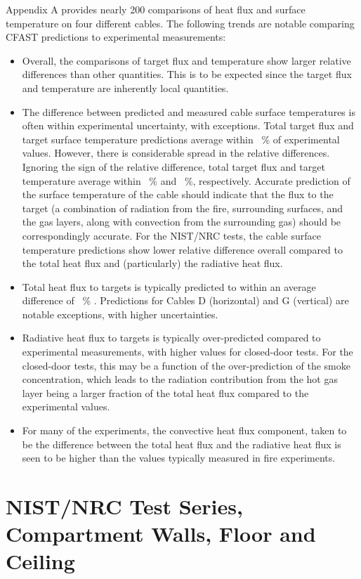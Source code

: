 Appendix A provides nearly 200 comparisons of heat flux and surface temperature on four different cables.  The following trends are notable comparing CFAST predictions to experimental measurements:
\begin{itemize}
\item Overall, the comparisons of target flux and temperature show larger relative differences than other quantities. This is to be expected since the target flux and temperature are inherently local quantities.
\item The difference between predicted and measured cable surface temperatures is often within experimental uncertainty, with exceptions.  Total target flux and target surface temperature predictions average within \Targfluxavg ~\% of experimental values.  However, there is considerable spread in the relative differences.  Ignoring the sign of the relative difference, total target flux and target temperature average within \Abstargfluxavg ~\% and \Abstargtempavg ~\%, respectively. Accurate prediction of the surface temperature of the cable should indicate that the flux to the target (a combination of radiation from the fire, surrounding surfaces, and the gas layers, along with convection from the surrounding gas) should be correspondingly accurate.  For the NIST/NRC tests, the cable surface temperature predictions show lower relative difference overall compared to the total heat flux and (particularly) the radiative heat flux.
\item Total heat flux to targets is typically predicted to within an average difference of \Targfluxavg~\% .  Predictions for Cables D (horizontal) and G (vertical) are notable exceptions, with higher uncertainties.
\item Radiative heat flux to targets is typically over-predicted compared to experimental measurements, with higher values for closed-door tests.  For the closed-door tests, this may be a function of the over-prediction of the smoke concentration, which leads to the radiation contribution from the hot gas layer being a larger fraction of the total heat flux compared to the experimental values.
\item For many of the experiments, the convective heat flux component, taken to be the difference between the total heat flux and the radiative heat flux is seen to be higher than the values typically measured in fire experiments.
\end{itemize}


\section{NIST/NRC Test Series, Compartment Walls, Floor and Ceiling}

